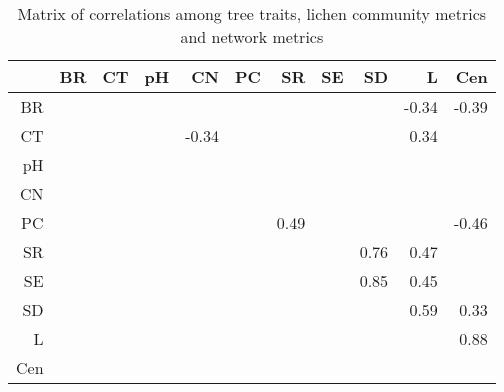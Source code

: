 \begin{table}[ht]
\centering
\begin{tabular}{rrrrrrrrrrr}
  \hline
 & BR & CT & pH & CN & PC & SR & SE & SD & L & Cen \\ 
  \hline
BR &  &  &  &  &  &  &  &  & -0.34 & -0.39 \\ 
  CT &  &  &  & -0.34 &  &  &  &  & 0.34 &  \\ 
  pH &  &  &  &  &  &  &  &  &  &  \\ 
  CN &  &  &  &  &  &  &  &  &  &  \\ 
  PC &  &  &  &  &  & 0.49 &  &  &  & -0.46 \\ 
  SR &  &  &  &  &  &  &  & 0.76 & 0.47 &  \\ 
  SE &  &  &  &  &  &  &  & 0.85 & 0.45 &  \\ 
  SD &  &  &  &  &  &  &  &  & 0.59 & 0.33 \\ 
  L &  &  &  &  &  &  &  &  &  & 0.88 \\ 
  Cen &  &  &  &  &  &  &  &  &  &  \\ 
   \hline
\end{tabular}
\caption{Matrix of correlations among tree traits, lichen community metrics and network metrics} 
\label{tab:cormat}
\end{table}
